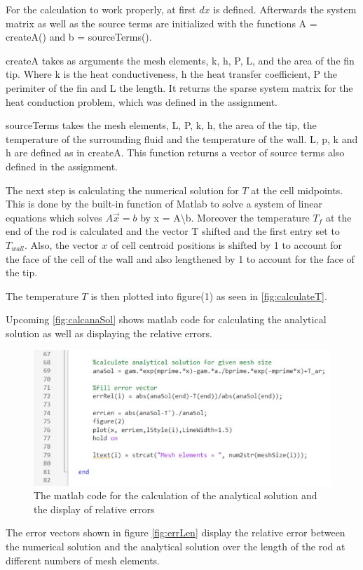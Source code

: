 For the calculation to work properly, at first $dx$ is defined. Afterwards the system matrix as well as the source terms are initialized with the functions A = createA() and b = sourceTerms().

createA takes as arguments the mesh elements, k, h, P, L, and the area of the fin tip. Where k is the heat conductiveness, h the heat transfer coefficient, P the perimiter of the fin and L the length. It returns the sparse system matrix for the heat conduction problem, which was defined in the assignment.

sourceTerms takes the mesh elements, L, P, k, h, the area of the tip, the temperature of the surrounding fluid and the temperature of the wall. L, p, k and h are defined as in createA. This function returns a vector of source terms also defined in the assignment.


The next step is calculating the numerical solution for $T$ at the cell midpoints. This is done by the built-in function of Matlab to solve a system of linear equations which solves $A\vec{x} = b$ by x = A\textbackslash b. Moreover the temperature $T_f$ at the end of the rod is calculated and the vector T shifted and the first entry set to $T_{wall}$. Also, the vector $x$ of cell centroid positions is shifted by 1 to account for the face of the cell of the wall and also lengthened by 1 to account for the face of the tip.


The temperature $T$ is then plotted into figure(1) as seen in \autoref{fig:calculateT}. 

Upcoming \autoref{fig:calcanaSol} shows matlab code for calculating the analytical solution as well as displaying the relative errors. 

\begin{figure}[H]
    \centering
    \includegraphics[width=.7\textwidth]{figures/calculate_anaSol_fill_errvec.jpg}
    \caption{The matlab code for the calculation of the analytical solution and the display of relative errors}
    \label{fig:calcanaSol}
\end{figure}

The error vectors shown in figure \autoref{fig:errLen} display the relative error between the numerical solution and the analytical solution over the length of the rod at different numbers of mesh elements. 

